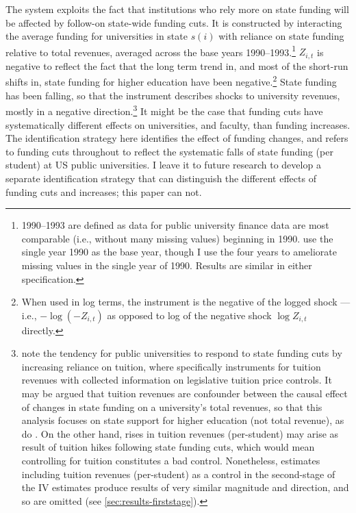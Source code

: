 The system exploits the fact that institutions who rely more on state funding will be affected by follow-on state-wide funding cuts.
It is constructed by interacting the average funding for universities in state $s(i)$ with reliance on state funding relative to total revenues, averaged across the base years 1990--1993.\footnote{
    1990--1993 are defined as data for public university finance data are most comparable (i.e., without many missing values) beginning in 1990.
    \cite{NBERw23736} use the single year 1990 as the base year, though I use the four years to ameliorate missing values in the single year of 1990.
    Results are similar in either specification.
}
$Z_{i,t}$ is negative to reflect the fact that the long term trend in, and most of the short-run shifts in, state funding for higher education have been negative.\footnote{
    When used in log terms, the instrument is the negative of the logged shock --- i.e., $- \log \left( -Z_{i,t} \right)$ as opposed to log of the negative shock $\log Z_{i,t}$ directly.
}
State funding has been falling, so that the instrument describes shocks to university revenues, mostly in a negative direction.\footnote{
    \label{foot:control}
    \cite{NBERw27885,webber2017state} note the tendency for public universities to respond to state funding cuts by increasing reliance on tuition, where \cite{NBERw23736} specifically instruments for tuition revenues with collected information on legislative tuition price controls.
    It may be argued that tuition revenues are confounder between the causal effect of changes in state funding on a university's total revenues, so that this analysis focuses on state support for higher education (not total revenue), as do \cite{NBERw27885}.
    On the other hand, rises in tuition revenues (per-student) may arise as result of tuition hikes following state funding cuts, which would mean controlling for tuition constitutes a bad control.
    Nonetheless, estimates including tuition revenues (per-student) as a control in the second-stage of the IV estimates produce results of very similar magnitude and direction, and so are omitted (see \autoref{sec:results-firststage}).
}
It might be the case that funding cuts have systematically different effects on universities, and faculty, than funding increases.
The identification strategy here identifies the effect of funding changes, and refers to funding cuts throughout to reflect the systematic falls of state funding (per student) at US public universities.
I leave it to future research to develop a separate identification strategy that can distinguish the different effects of funding cuts and increases; this paper can not.

